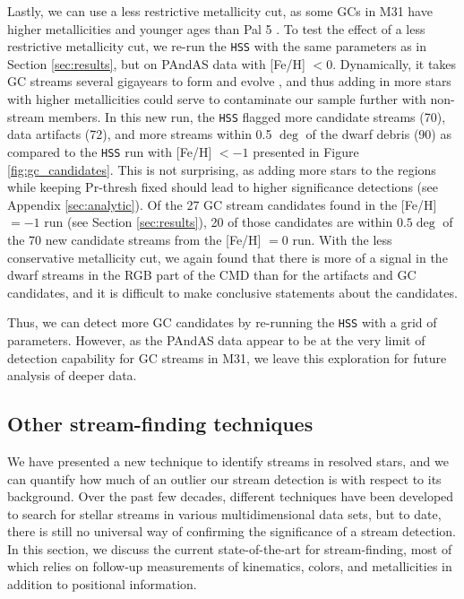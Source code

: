 \documentclass[twocolumn]{aastex631}
\begin{document}
Lastly, we can use a less restrictive metallicity cut, as some GCs in M31 have higher metallicities and younger ages than Pal 5 \citep[e.g.,][]{caldwell16}. To test the effect of a less restrictive metallicity cut, we re-run the \texttt{HSS} with the same parameters as in Section \ref{sec:results}, but on PAndAS data with [Fe/H] $< 0$. Dynamically, it takes GC streams several gigayears to form and evolve \citep[e.g.,][]{johnston01}, and thus adding in more stars with higher metallicities could serve to contaminate our sample further with non-stream members. In this new run, the \texttt{HSS} flagged more candidate streams (70), data artifacts (72), and more streams within 0.5 $\deg$ of the dwarf debris (90) as compared to the \texttt{HSS} run with [Fe/H] $< -1$ presented in Figure \ref{fig:gc_candidates}. This is not surprising, as adding more stars to the regions while keeping Pr-thresh fixed should lead to higher significance detections (see Appendix \ref{sec:analytic}). Of the 27 GC stream candidates found in the [Fe/H] $= -1$ run (see Section \ref{sec:results}), 20 of those candidates are within $0.5\deg$ of the 70 new candidate streams from the [Fe/H] $= 0$ run.
With the less conservative metallicity cut, we again found that there is more of a signal in the dwarf streams in the RGB part of the CMD than for the artifacts and GC candidates, and it is difficult to make conclusive statements about the candidates. 

Thus, we can detect more GC candidates by re-running the \texttt{HSS} with a grid of parameters. However, as the PAndAS data appear to be at the very limit of detection capability for GC streams in M31, we leave this exploration for future analysis of deeper data.



\subsection{Other stream-finding techniques}\label{sec:othercodes}
We have presented a new technique to identify streams in resolved stars, and we can quantify how much of an outlier our stream detection is with respect to its background. 
Over the past few decades, different techniques have been developed to search for stellar streams in various multidimensional data sets, but to date, there is still no universal way of confirming the significance of a stream detection. 
In this section, we discuss the current state-of-the-art for stream-finding, most of which relies on follow-up measurements of kinematics, colors, and metallicities in addition to positional information.
\end{document}
